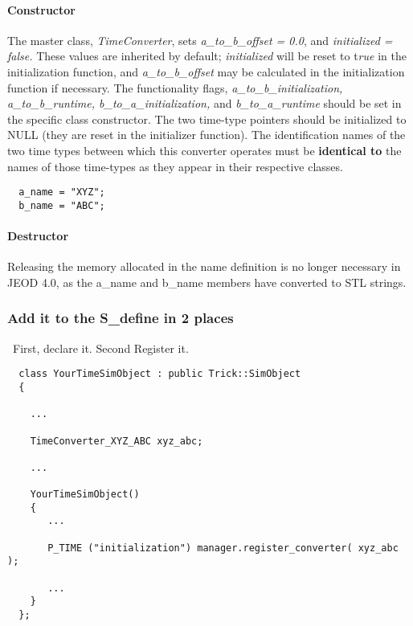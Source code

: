 \paragraph{Constructor}
The master class, \textit{TimeConverter}, sets \textit{a\_to\_b\_offset = 0.0},
and \textit{initialized = false. } These values are inherited by
default; \textit{initialized} will be reset to t\textit{rue} in the
initialization function, and \textit{a\_to\_b\_offset} may be
calculated in the initialization function if necessary.  The
functionality flags, \textit{a\_to\_b\_initialization, 
a\_to\_b\_runtime, b\_to\_a\_initialization,} and
\textit{b\_to\_a\_runtime} should be set in the specific class
constructor.  The two time-type pointers should be initialized to NULL
(they are reset in the initializer function).  The identification names
of the two time types between which this converter operates must be \textbf{identical to} the names of those time-types as
they appear in their respective classes.

\begin{verbatim}
  a_name = "XYZ";
  b_name = "ABC";
\end{verbatim}

\paragraph[Destructor]{Destructor}
Releasing the memory allocated in the name definition is no longer necessary in JEOD 4.0, as the a\_name and b\_name members have converted to STL strings.

\subsubsection[Add it to the S\_define in 2 places]{\rmfamily\bfseries Add
it to the S\_define in 2 places}
\ First, declare it. Second Register it.

\begin{verbatim}
  class YourTimeSimObject : public Trick::SimObject
  {
    
    ...

    TimeConverter_XYZ_ABC xyz_abc;
    
    ...

    YourTimeSimObject()
    {
       ...

       P_TIME ("initialization") manager.register_converter( xyz_abc );
      
       ...
    }
  };
\end{verbatim}

